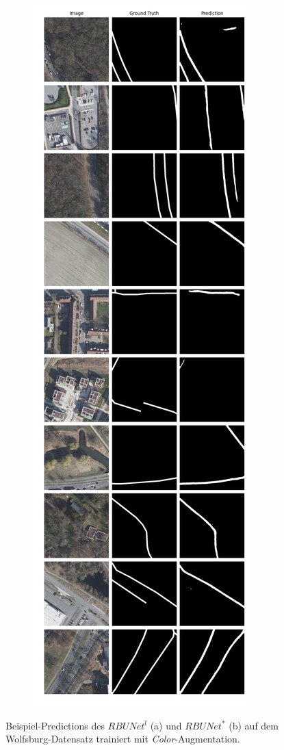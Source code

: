 \begin{figure}[H]
\begin{subfigure}{.4\textwidth}
		\caption{}
	\end{subfigure}
	\begin{subfigure}{.4\textwidth}
		\centering
		\includegraphics[width=1.\textwidth]{Bilder/wolfsburg-color-samples/rbunet-s.png}
		\caption{}
	\end{subfigure}
	\caption{Beispiel-Predictions des $RBUNet^l$ (a) und $RBUNet^*$ (b) auf dem Wolfsburg-Datensatz trainiert mit \textit{Color}-Augmentation.}
	\label{fig:wolfsburg-samples-rbunet-l-rbunet-s-color}
\end{figure}

